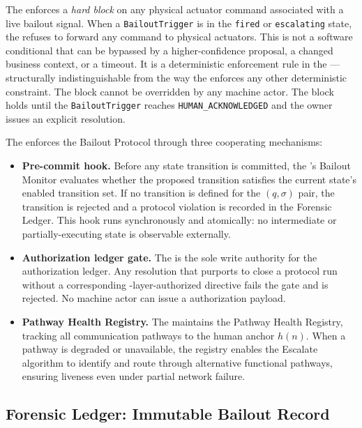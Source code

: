 The \fact{} enforces a \textit{hard block} on any physical actuator command associated with a live bailout signal. When a \texttt{BailoutTrigger} is in the \texttt{fired} or \texttt{escalating} state, the \fact{} refuses to forward any \bounds{} command to physical actuators. This is not a software conditional that can be bypassed by a higher-confidence proposal, a changed business context, or a timeout. It is a deterministic enforcement rule in the \fact{} — structurally indistinguishable from the way the \fact{} enforces any other deterministic constraint. The block cannot be overridden by any machine actor. The block holds until the \texttt{BailoutTrigger} reaches \texttt{HUMAN\_ACKNOWLEDGED} and the \purpose{} owner issues an explicit resolution.

The \fact{} enforces the Bailout Protocol through three cooperating mechanisms:

\begin{itemize}
\item[(\textit{i})] \textbf{Pre-commit hook.} Before any state transition is committed, the \fact's Bailout Monitor evaluates whether the proposed transition satisfies the current state's enabled transition set. If no transition is defined for the $(q, \sigma)$ pair, the transition is rejected and a protocol violation is recorded in the Forensic Ledger. This hook runs synchronously and atomically: no intermediate or partially-executing state is observable externally.
\item[(\textit{ii})] \textbf{Authorization ledger gate.} The \fact{} is the sole write authority for the authorization ledger. Any resolution that purports to close a protocol run without a corresponding \purpose{}-layer-authorized directive fails the gate and is rejected. No machine actor can issue a \purpose{} authorization payload.
\item[(\textit{iii})] \textbf{Pathway Health Registry.} The \fact{} maintains the Pathway Health Registry, tracking all communication pathways to the human anchor $h(n)$. When a pathway is degraded or unavailable, the registry enables the Escalate algorithm to identify and route through alternative functional pathways, ensuring liveness even under partial network failure.
\end{itemize}

\subsection{Forensic Ledger: Immutable Bailout Record}
\label{sec:forensic-ledger}

